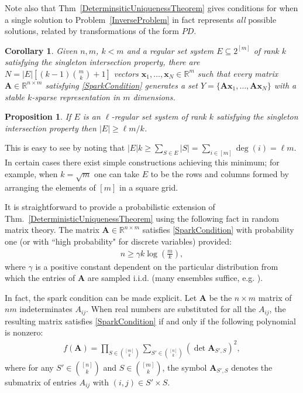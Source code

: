 \documentclass[9pt,twocolumn]{pnas-new}
\newtheorem{proposition}{Proposition}
\newtheorem{corollary}{Corollary}
\begin{document}
Note also that Thm~\ref{DeterminsiticUniquenessTheorem} gives conditions for when a single solution to Problem~\ref{InverseProblem} in fact represents \emph{all} possible solutions, related by transformations of the form $PD$.

\begin{corollary}\label{DeterministicUniquenessCorollary}
Given $n, m$, $k < m$ and a regular set system $E \subseteq 2^{[m]}$ of rank $k$ satisfying the singleton intersection property, there are $N =  |E| \left[ (k-1){m \choose k}+1 \right]$ vectors \mbox{$\mathbf{x}_1, \ldots, \mathbf{x}_N \in \mathbb{R}^m$} such that every matrix $\mathbf{A} \in \mathbb{R}^{n \times m}$ satisfying \eqref{SparkCondition} generates a set $Y = \{\mathbf{A}\mathbf{x}_1, \ldots, \mathbf{A}\mathbf{x}_N\}$ with a stable $k$-sparse representation in $m$ dimensions.
\end{corollary}

\begin{proposition}
If $E$ is an $\ell$-regular set system of rank $k$ satisfying the singleton intersection property then $|E| \geq \ell m/k$. 
\end{proposition}
This is easy to see by noting that $|E|k \geq \sum_{S \in E}|S| = \sum_{i \in [m]} \deg(i) = \ell m$. In certain cases there exist simple constructions achieving this minimum; for example, when $k = \sqrt{m}$ one can take $E$ to be the rows and columns formed by arranging the elements of $[m]$ in a square grid.

It is straightforward to provide a probabilistic extension of Thm.~\ref{DeterministicUniquenessTheorem} using the following fact in random matrix theory.  The matrix $\mathbf{A} \in \mathbb{R}^{n \times m}$ satisfies \eqref{SparkCondition} with probability one (or with ``high probability" for discrete variables) 
provided:
\begin{align}\label{CScondition}
n \geq \gamma k\log\left(\frac{m}{k}\right),
\end{align}
%
where $\gamma$ is a positive constant dependent on the particular distribution from which the entries of $\mathbf{A}$ are sampled i.i.d. (many ensembles suffice, e.g. \cite[Sec.~4]{Baraniuk08}). 

In fact, the spark condition can be made explicit.  Let $\mathbf{A}$  be the $n \times m$ matrix of $nm$ indeterminates $A_{ij}$. When real numbers are substituted for all the $A_{ij}$, the resulting matrix satisfies \eqref{SparkCondition} if and only if the following polynomial is nonzero:
\begin{align*}
f(\mathbf{A}) = \prod_{S \in {[m] \choose k}} \sum_{S' \in {[n] \choose k}} (\det \mathbf{A}_{S',S})^2,
\end{align*}
%
where for any $S' \in {[n] \choose k}$ and $S \in {[m] \choose k}$, the symbol $\mathbf{A}_{S',S}$ denotes the submatrix of entries $A_{ij}$ with $(i,j) \in S' \times S$. 
\end{document}
